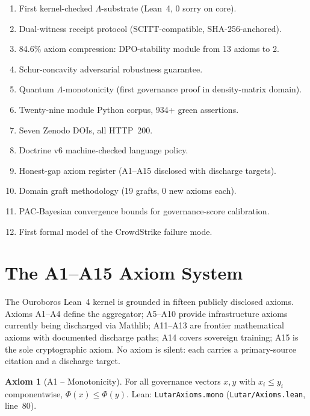 \documentclass[11pt,letterpaper]{article}
\theoremstyle{definition}
\newtheorem{axiom}[theorem]{Axiom}
\theoremstyle{remark}
\begin{document}
\begin{enumerate}\setlength{\itemsep}{0pt}
  \item First kernel-checked \(\Lambda\)-substrate (Lean~4, 0 sorry on core).
  \item Dual-witness receipt protocol (SCITT-compatible, SHA-256-anchored).
  \item 84.6\% axiom compression: DPO-stability module from 13 axioms to 2.
  \item Schur-concavity adversarial robustness guarantee.
  \item Quantum \(\Lambda\)-monotonicity (first governance proof in density-matrix domain).
  \item Twenty-nine module Python corpus, 934+ green assertions.
  \item Seven Zenodo DOIs, all HTTP~200.
  \item Doctrine v6 machine-checked language policy.
  \item Honest-gap axiom register (A1--A15 disclosed with discharge targets).
  \item Domain graft methodology (19 grafts, 0 new axioms each).
  \item PAC-Bayesian convergence bounds for governance-score calibration.
  \item First formal model of the CrowdStrike failure mode.
\end{enumerate}

\section{The A1--A15 Axiom System}
\label{sec:axioms}

The Ouroboros Lean~4 kernel is grounded in fifteen publicly disclosed
axioms.
Axioms A1--A4 define the aggregator; A5--A10 provide infrastructure
axioms currently being discharged via Mathlib;
A11--A13 are frontier mathematical axioms with documented discharge
paths; A14 covers sovereign training; A15 is the sole cryptographic
axiom.
No axiom is silent: each carries a primary-source citation and a
discharge target.

\begin{axiom}[A1 -- Monotonicity]
For all governance vectors \(x, y\) with \(x_i \le y_i\) componentwise,
\(\Phi(x) \le \Phi(y)\).
\textup{Lean:} \texttt{LutarAxioms.mono}
(\texttt{Lutar/Axioms.lean}, line~80).
\end{axiom}
\end{document}
